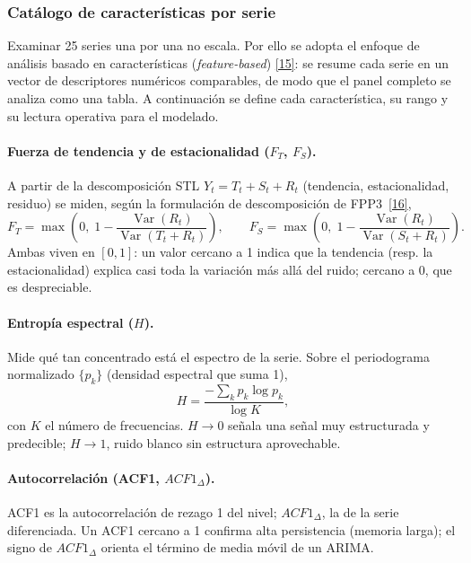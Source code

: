 \documentclass[12pt,letterpaper]{report}
\newcommand{\cita}[1]{\hyperref[bib:#1]{[#1]}}
\begin{document}
\subsubsection{Catálogo de características por serie}

Examinar 25 series una por una no escala. Por ello se adopta el enfoque de análisis
basado en características (\textit{feature-based}) \cita{15}: se resume cada serie en
un vector de descriptores numéricos comparables, de modo que el panel completo se
analiza como una tabla. A continuación se define cada característica, su rango y su
lectura operativa para el modelado.

\paragraph{Fuerza de tendencia y de estacionalidad ($F_T$, $F_S$).} A partir de la
descomposición STL $Y_t = T_t + S_t + R_t$ (tendencia, estacionalidad, residuo) se
miden, según la formulación de descomposición de FPP3~\cita{16},
\begin{equation}
F_T = \max\!\left(0,\; 1 - \frac{\operatorname{Var}(R_t)}{\operatorname{Var}(T_t + R_t)}\right),
\qquad
F_S = \max\!\left(0,\; 1 - \frac{\operatorname{Var}(R_t)}{\operatorname{Var}(S_t + R_t)}\right).
\end{equation}
Ambas viven en $[0,1]$: un valor cercano a 1 indica que la tendencia (resp. la
estacionalidad) explica casi toda la variación más allá del ruido; cercano a 0, que
es despreciable.

\paragraph{Entropía espectral ($H$).} Mide qué tan concentrado está el espectro de la
serie. Sobre el periodograma normalizado $\{p_k\}$ (densidad espectral que suma 1),
\begin{equation}
H = \frac{-\sum_k p_k \log p_k}{\log K},
\end{equation}
con $K$ el número de frecuencias. $H \to 0$ señala una señal muy estructurada y
predecible; $H \to 1$, ruido blanco sin estructura aprovechable.

\paragraph{Autocorrelación (ACF1, $ACF1_\Delta$).} ACF1 es la autocorrelación de
rezago 1 del nivel; $ACF1_\Delta$, la de la serie diferenciada. Un ACF1 cercano a 1
confirma alta persistencia (memoria larga); el signo de $ACF1_\Delta$ orienta el
término de media móvil de un ARIMA.
\end{document}
